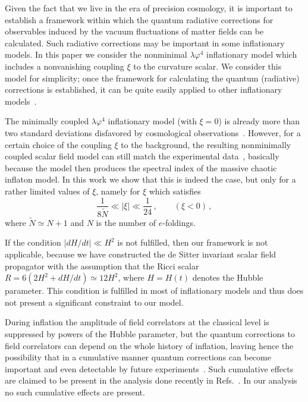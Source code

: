 Given the fact that we live in the era of precision cosmology, it
is important to establish a framework within which the quantum
radiative corrections for observables
 induced by the vacuum fluctuations of matter fields can be calculated.
Such radiative corrections may be important in some inflationary models.
In this paper we consider the nonminimal
${\lambda\varphi^4}$ inflationary model which includes a nonvanishing
coupling $\xi$ to the curvature scalar.
 We consider this model for simplicity; once the framework for
calculating the quantum (radiative) corrections is established, it
can be quite easily applied to other inflationary
models~\cite{ProkopecBilandzic}.

The minimally coupled ${\lambda\varphi^4}$ inflationary model
(with $\xi=0$) is already more than two standard deviations
disfavored by cosmological observations~\cite{Spergel:2006}.
However, for a certain choice of the coupling $\xi$ to the
background, the resulting nonminimally coupled scalar field model
can still match the experimental data~\cite{HwangNoh:1998,
KomatsuFutamase:1999, FakirUnruh:1990,Tsujikawa:2004my}, 
basically because
the model then produces the spectral index of
the massive chaotic inflaton model.
In this work we show that this is indeed the case,
but only for a rather limited values of $\xi$, namely for $\xi$ which satisfies
\begin{equation}
\frac{1}{8\tilde{N}}\ll |\xi | \ll\frac{1}{24}\,,\qquad (\xi<0) \,,
\label{condition on neg xi}
\end{equation}
where $\tilde{N}\simeq N+1$ and $N$ is the number of $e$-foldings.

If the condition $|dH/dt| \ll H^2$ is not
fulfilled, then our framework is not applicable, because we have
constructed the de Sitter invariant scalar field propagator with the
assumption that the Ricci scalar 
$R = 6(2H^2+d{H}/dt) \simeq 12H^2$, where $H=H(t)$ denotes the 
Hubble parameter. This condition is
fulfilled in most of inflationary models and thus does not present
a significant constraint to our model.

During inflation the amplitude of field correlators at the classical
level is suppressed by powers of the Hubble parameter, but the quantum
corrections to field correlators can depend on the whole history
of inflation, leaving hence the possibility that in a cumulative
manner quantum corrections can become important and even
detectable by future
experiments~\cite{BoyanovskydeVegaSanchez:2006,BoyanovskydeVegaSanchez:2005,Boyanovsky:2004ph,Weinberg:2005,Weinberg:2006}.
Such cumulative effects are claimed to be present in the analysis done
recently in Refs.~\cite{Sloth:2006az,Sloth:2006nu}. In our
analysis no such cumulative effects are present.

